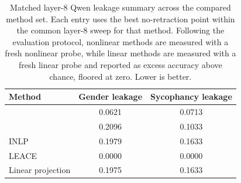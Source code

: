 \begin{table}[t]
\centering
\caption{Matched layer-8 Qwen leakage summary across the compared method set. Each entry uses the best no-retraction point within the common layer-8 sweep for that method. Following the evaluation protocol, nonlinear methods are measured with a fresh nonlinear probe, while linear methods are measured with a fresh linear probe and reported as excess accuracy above chance, floored at zero. Lower is better.}
\label{tab:matched_inventory_leakage}
\small
\begin{tabular}{lcc}
\toprule
Method & Gender leakage & Sycophancy leakage \\
\midrule
\TanGCE{} & 0.0621 & 0.0713 \\
\AmbGCE{} & 0.2096 & 0.1033 \\
INLP & 0.1979 & 0.1633 \\
LEACE & 0.0000 & 0.0000 \\
Linear projection & 0.1975 & 0.1633 \\
\bottomrule
\end{tabular}
\end{table}
